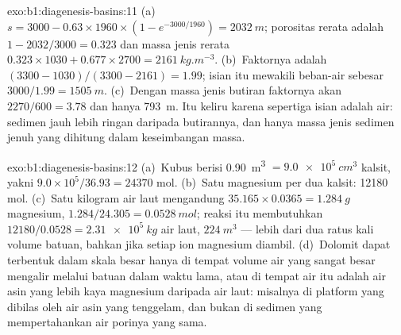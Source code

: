 \begin{solution}{exo:b1:diagenesis-basins:11}
(a)~$s = 3000 - 0.63\times1960\times(1 - e^{-3000/1960}) = \qty{2032}{m}$; porositas
rerata adalah $1 - 2032/3000 = \num{0.323}$ dan massa jenis rerata
$0.323\times1030 + 0.677\times2700 = \qty{2161}{kg.m^{-3}}$. (b)~Faktornya adalah
$(3300 - 1030)/(3300 - 2161) = \num{1.99}$; isian itu mewakili  beban-air
sebesar $3000/1.99 = \qty{1505}{m}$. (c)~Dengan massa jenis butiran faktornya akan
$2270/600 = \num{3.78}$ dan  hanya \qty{793}{m}. Itu keliru karena sepertiga
isian adalah air: sedimen jauh lebih ringan daripada butirannya, dan hanya massa jenis sedimen
jenuh yang dihitung dalam keseimbangan massa.
\end{solution}

\begin{solution}{exo:b1:diagenesis-basins:12}
(a)~Kubus berisi \qty{0.90}{m^3} $= \qty{9.0e5}{cm^3}$ kalsit, yakni $9.0\times10^5/36.93 = \num{24370}$ mol. (b)~Satu magnesium per dua kalsit: \num{12180} mol. (c)~Satu
kilogram air laut mengandung $35.165\times0.0365 =
\qty{1.284}{g}$ magnesium,
$1.284/24.305 = \qty{0.0528}{mol}$; reaksi itu membutuhkan $12180/0.0528 = \qty{2.31e5}{kg}$ air laut, $\qty{224}{m^3}$ --- lebih dari dua ratus kali volume batuan,
bahkan jika setiap ion magnesium diambil. (d)~Dolomit dapat terbentuk dalam skala besar
hanya di tempat volume air yang sangat besar mengalir melalui batuan dalam waktu lama,
atau di tempat air itu adalah air asin yang lebih kaya magnesium daripada air laut:
misalnya di platform yang dibilas oleh air asin yang tenggelam, dan bukan di sedimen
yang mempertahankan air porinya yang sama.
\end{solution}

